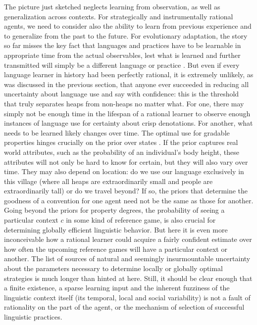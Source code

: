 \documentclass[a4paper]{article}
\begin{document}
The picture just sketched neglects learning from observation, as well as generalization across contexts. 
For strategically and instrumentally rational agents, we need to consider also the ability to learn from previous experience and to generalize from the past to the future. 
For evolutionary adaptation, the story so far misses the key fact that languages and practices have to be learnable in appropriate time from the actual observables, lest what is learned and further transmitted will simply be a different language or practice \parencite[\emph{e.g.}][]{KirbyGriffith2014:Iterated-Learni}.
But even if every language learner in history had been perfectly rational, it is extremely unlikely, as was discussed in the previous section, that anyone ever succeeded in reducing all uncertainty about language use and say with confidence: this is the threshold that truly separates heaps from non-heaps no matter what. 
For one, there may simply not be enough time in the lifespan of a rational learner to observe enough instances of language use for certainty about crisp denotations. 
For another, what needs to be learned likely changes over time. 
The optimal use for gradable properties hinges crucially on the prior over states \parencite[\emph{e.g.}][]{Franke2012:Scales-Salience,Franke2012:On-Scales-Salie,QingFranke2014:Gradable-Adject,LassiterGoodman2015:Adjectival-vagu}. 
If the prior captures real world attributes, such as the probability of an individual's body height, these attributes will not only be hard to know for certain, but they will also vary over time. 
They may also depend on location: do we use our language exclusively in this village (where all heaps are extraordinarily small and people are extraordinarily tall) or do we travel beyond? 
If so, the priors that determine the goodness of a convention for one agent need not be the same as those for another. 
Going beyond the priors for property degrees, the probability of seeing a particular context $c$ in some kind of reference game, is also crucial for determining globally efficient linguistic behavior. 
But here it is even more inconceivable how a rational learner could acquire a fairly confident estimate over how often the upcoming reference games will have a particular context or another. 
The list of sources of natural and seemingly insurmountable uncertainty about the parameters necessary to determine locally or globally optimal strategies is much longer than hinted at here. 
Still, it should be clear enough that a finite existence, a sparse learning input and the inherent fuzziness of the linguistic context itself (its temporal, local and social variability) is not a fault of rationality on the part of the agent, or the mechanism of selection of successful linguistic practices. 
\end{document}
